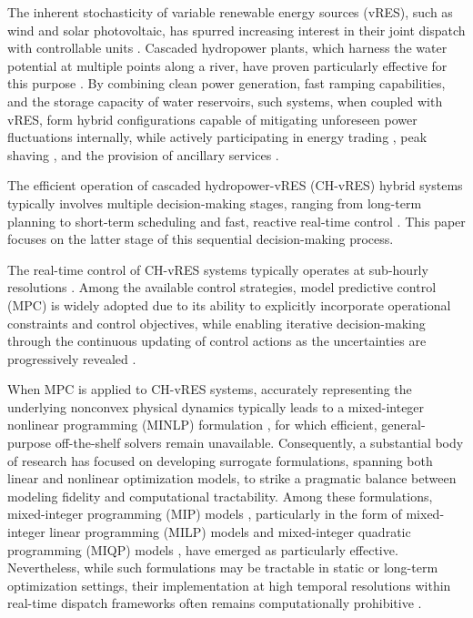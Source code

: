 \documentclass[a4paper,fleqn]{cas-sc}
\begin{document}
The inherent stochasticity of variable renewable energy sources (vRES), such as wind and solar photovoltaic, has spurred increasing interest in their joint dispatch with controllable units \citep{jing2024benefit}.
Cascaded hydropower plants, which harness the water potential at multiple points along a river, have proven particularly effective for this purpose \citep{apostolopoulou2018robust}.
By combining clean power generation, fast ramping capabilities, and the storage capacity of water reservoirs, such systems, when coupled with vRES, form hybrid configurations capable of mitigating unforeseen power fluctuations internally,
while actively participating in energy trading \citep{ma2022decentralized}, peak shaving \citep{wu2024short}, and the provision of ancillary services \citep{santosuosso2023economic}.

The efficient operation of cascaded hydropower-vRES (CH-vRES) hybrid systems typically involves multiple decision-making stages, ranging from long-term planning to short-term scheduling and fast, reactive real-time control \citep{su2025real}.
This paper focuses on the latter stage of this sequential decision-making process.

The real-time control of CH-vRES systems typically operates at sub-hourly resolutions \citep{hamann2014real}.
Among the available control strategies, model predictive control (MPC) is widely adopted due to its ability to explicitly incorporate operational constraints and control objectives,
while enabling iterative decision-making through the continuous updating of control actions as the uncertainties are progressively revealed \citep{ye2023real}.

When MPC is applied to CH-vRES systems, accurately representing the underlying nonconvex physical dynamics typically leads to a mixed-integer nonlinear programming (MINLP) formulation \citep{karamyar2025scalable}, for which efficient, general-purpose off-the-shelf solvers remain unavailable.
Consequently, a substantial body of research has focused on developing surrogate formulations, spanning both linear \citep{liu2026day} and nonlinear \citep{lu2024medium} optimization models, to strike a pragmatic balance between modeling fidelity and computational tractability.
Among these formulations, mixed-integer programming (MIP) models \citep{zhao2025hydro}, particularly in the form of mixed-integer linear programming (MILP) models \citep{zhang2025comparative} and mixed-integer quadratic programming (MIQP) models \citep{liao2021daily}, have emerged as particularly effective.
Nevertheless, while such formulations may be tractable in static or long-term optimization settings,
their implementation at high temporal resolutions within real-time dispatch frameworks often remains computationally prohibitive \citep{wang2026deep}.
\end{document}
